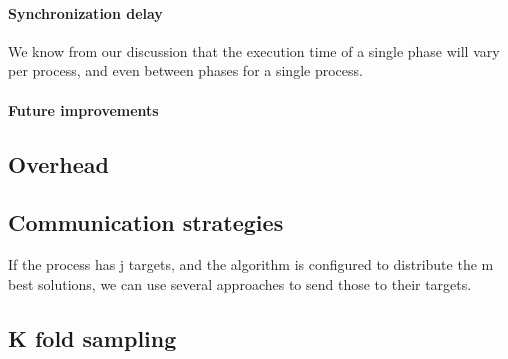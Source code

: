\paragraph{Synchronization delay}
We know from our discussion that the execution time of a single phase will vary per process, and even between phases for a single process. 
\paragraph{Future improvements}
\subsection{Overhead}
\subsection{Communication strategies}
If the process has j targets, and the algorithm is configured to distribute the m best solutions, we can use several approaches to send those to their targets. %
\subsection{K fold sampling}
